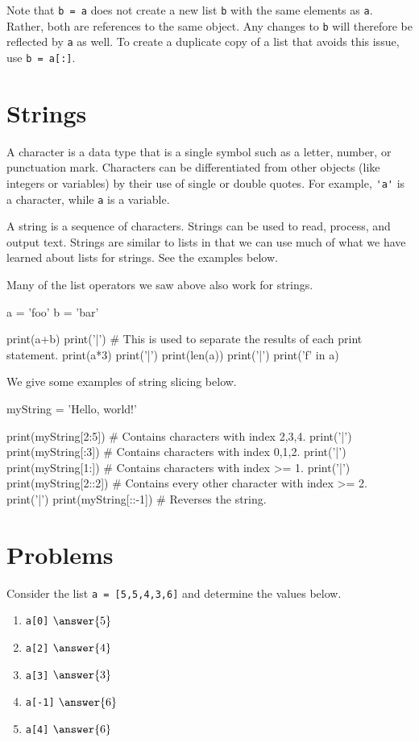 \documentclass{ximera}
\begin{document}
Note that \verb|b = a| does not create a new list \verb|b| with the same elements as \verb|a|. Rather, both are references to the same object. Any changes to \verb|b| will therefore be reflected by \verb|a| as well. To create a duplicate copy of a list that avoids this issue, use \verb|b = a[:]|.

\section{Strings}

A character is a data type that is a single symbol such as a letter, number, or punctuation mark. Characters can be differentiated from other objects (like integers or variables) by their use of single or double quotes. For example, \verb|'a'| is a character, while \verb|a| is a variable.

A string is a sequence of characters. Strings can be used to read, process, and output text. Strings are similar to lists in that we can use much of what we have learned about lists for strings. See the examples below.

Many of the list operators we saw above also work for strings.

\begin{sageCell}
a = 'foo'
b = 'bar'

print(a+b)
print('|') # This is used to separate the results of each print statement.
print(a*3)
print('|')
print(len(a))
print('|')
print('f' in a)
\end{sageCell}

We give some examples of string slicing below.

\begin{sageCell}
myString = 'Hello, world!'

print(myString[2:5])  # Contains characters with index 2,3,4.
print('|')
print(myString[:3])   # Contains characters with index 0,1,2.
print('|')
print(myString[1:])   # Contains characters with index >= 1.
print('|')
print(myString[2::2]) # Contains every other character with index >= 2.
print('|')
print(myString[::-1]) # Reverses the string.
\end{sageCell}


\section{Problems}

\begin{question}
Consider the list \verb|a = [5,5,4,3,6]| and determine the values below.
	\begin{enumerate}
	\item \verb|a[0]| $\answer{5}$
	\item \verb|a[2]| $\answer{4}$
	\item \verb|a[3]| $\answer{3}$
	\item \verb|a[-1]| $\answer{6}$
	\item \verb|a[4]| $\answer{6}$
	\end{enumerate}
\end{question}
\end{document}
